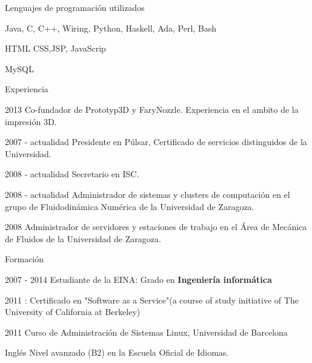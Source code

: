 \begin{cv}{}
\vspace{2em}
\begin{cvlist}{Lenguajes de programación utilizados}
\item Java, C, C++, Wiring, Python, Haskell, Ada, Perl, Bash
\item HTML CSS,JSP, JavaScrip
\item MySQL
\end{cvlist}

\begin{cvlist}{Experiencia}

	\item[2013] Co-fundador de Prototyp3D y FaryNozzle. Experiencia en el ambito de la impresión 3D.
	\item[2007 - actualidad] Presidente en Púlsar, Certificado de servicios distinguidos de la Universidad.
	\item[2008 - actualidad] Secretario en ISC.
	\item[2008 - actualidad] Administrador de sistemas y clusters de computación en el grupo de Fluidodinámica Numérica de la Universidad de Zaragoza.
	\item[2008] Administrador de servidores y estaciones de trabajo en el Área de Mecánica de Fluidos de la Universidad de Zaragoza.

\end{cvlist}

\begin{cvlist}{Formación}

	\item[2007 - 2014] Estudiante de la EINA: Grado en \textbf{Ingeniería informática}
	\item[2011]: Certificado en "Software as a Service"(a course of study initiative of The University of California at Berkeley) 
	\item [2011] Curso de Administración de Sistemas Linux, Universidad de Barcelona
	\item [Inglés] Nivel avanzado (B2) en la Escuela Oficial de Idiomas.

\end{cvlist}

\end{cv}